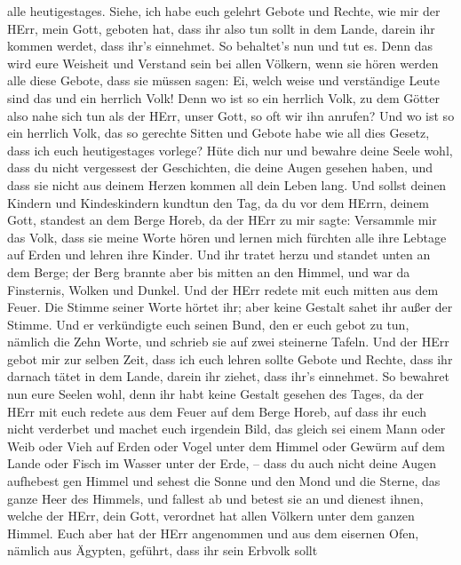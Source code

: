 alle heutigestages.  Siehe, ich habe euch gelehrt Gebote und
Rechte, wie mir der HErr, mein Gott, geboten hat, dass ihr also tun
sollt in dem Lande, darein ihr kommen werdet, dass ihr's einnehmet.
 So behaltet's nun und tut es. Denn das wird eure Weisheit
und Verstand sein bei allen Völkern, wenn sie hören werden alle diese
Gebote, dass sie müssen sagen: Ei, welch weise und verständige Leute
sind das und ein herrlich Volk!  Denn wo ist so ein herrlich
Volk, zu dem Götter also nahe sich tun als der HErr, unser Gott, so oft
wir ihn anrufen?  Und wo ist so ein herrlich Volk, das so
gerechte Sitten und Gebote habe wie all dies Gesetz, dass ich euch
heutigestages vorlege?  Hüte dich nur und bewahre deine
Seele wohl, dass du nicht vergessest der Geschichten, die deine Augen
gesehen haben, und dass sie nicht aus deinem Herzen kommen all dein
Leben lang. Und sollst deinen Kindern und Kindeskindern kundtun
 den Tag, da du vor dem HErrn, deinem Gott, standest an dem
Berge Horeb, da der HErr zu mir sagte: Versammle mir das Volk, dass sie
meine Worte hören und lernen mich fürchten alle ihre Lebtage auf Erden
und lehren ihre Kinder.  Und ihr tratet herzu und standet
unten an dem Berge; der Berg brannte aber bis mitten an den Himmel, und
war da Finsternis, Wolken und Dunkel.  Und der HErr redete
mit euch mitten aus dem Feuer. Die Stimme seiner Worte hörtet ihr; aber
keine Gestalt sahet ihr außer der Stimme.  Und er
verkündigte euch seinen Bund, den er euch gebot zu tun, nämlich die Zehn
Worte, und schrieb sie auf zwei steinerne Tafeln.  Und der
HErr gebot mir zur selben Zeit, dass ich euch lehren sollte Gebote und
Rechte, dass ihr darnach tätet in dem Lande, darein ihr ziehet, dass
ihr's einnehmet.  So bewahret nun eure Seelen wohl, denn
ihr habt keine Gestalt gesehen des Tages, da der HErr mit euch redete
aus dem Feuer auf dem Berge Horeb,  auf dass ihr euch nicht
verderbet und machet euch irgendein Bild, das gleich sei einem Mann oder
Weib  oder Vieh auf Erden oder Vogel unter dem Himmel
 oder Gewürm auf dem Lande oder Fisch im Wasser unter der
Erde, --  dass du auch nicht deine Augen aufhebest gen
Himmel und sehest die Sonne und den Mond und die Sterne, das ganze Heer
des Himmels, und fallest ab und betest sie an und dienest ihnen, welche
der HErr, dein Gott, verordnet hat allen Völkern unter dem ganzen
Himmel.  Euch aber hat der HErr angenommen und aus dem
eisernen Ofen, nämlich aus Ägypten, geführt, dass ihr sein Erbvolk sollt

